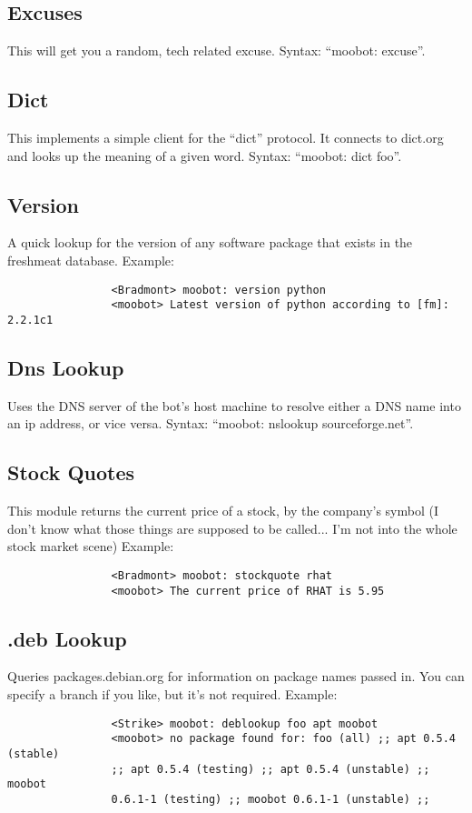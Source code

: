 \documentclass[titlepage]{article}
\begin{document}
		\subsection{Excuses}
			This will get you a random, tech related excuse.  Syntax:
			``moobot: excuse''.
		\subsection{Dict}
			This implements a simple client for the ``dict'' protocol.  It
			connects to dict.org and looks up the meaning of a given word.
			Syntax:  ``moobot: dict foo''.
		\subsection{Version}
			A quick lookup for the version of any software package that
			exists in the freshmeat database.  Example:
			\begin{verbatim}
				<Bradmont> moobot: version python
				<moobot> Latest version of python according to [fm]: 2.2.1c1
			\end{verbatim}
		\subsection{Dns Lookup}
			Uses the DNS server of the bot's host machine to resolve
			either a DNS  name into an ip address, or vice versa.
			Syntax:  ``moobot: nslookup sourceforge.net''.
		\subsection{Stock Quotes}
			This module returns the current price of a stock, by the
			company's symbol (I don't know what those things are supposed
			to be called...  I'm not into the whole stock market scene)
			Example:
			\begin{verbatim}
				<Bradmont> moobot: stockquote rhat
				<moobot> The current price of RHAT is 5.95
			\end{verbatim}
		\subsection{.deb Lookup}
			Queries packages.debian.org for information on package names
			passed in.  You can specify a branch if you like, but it's not
			required. Example:
			\begin{verbatim}
				<Strike> moobot: deblookup foo apt moobot
				<moobot> no package found for: foo (all) ;; apt 0.5.4 (stable)
				;; apt 0.5.4 (testing) ;; apt 0.5.4 (unstable) ;; moobot
				0.6.1-1 (testing) ;; moobot 0.6.1-1 (unstable) ;; 
			\end{verbatim}
	
\end{document}
